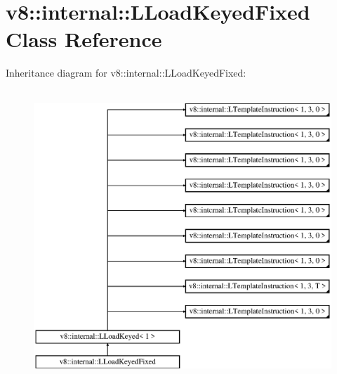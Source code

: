 \hypertarget{classv8_1_1internal_1_1_l_load_keyed_fixed}{}\section{v8\+:\+:internal\+:\+:L\+Load\+Keyed\+Fixed Class Reference}
\label{classv8_1_1internal_1_1_l_load_keyed_fixed}
Inheritance diagram for v8\+:\+:internal\+:\+:L\+Load\+Keyed\+Fixed\+:\begin{figure}[H]
\begin{center}
\leavevmode
\includegraphics[height=11.000000cm]{classv8_1_1internal_1_1_l_load_keyed_fixed}
\end{center}
\end{figure}
